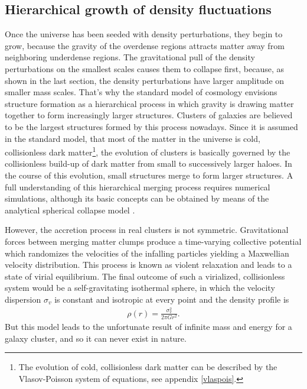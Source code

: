\subsection{Hierarchical growth of density fluctuations}
Once the universe has been seeded with density perturbations, they begin to
grow, because the gravity of the overdense regions attracts matter
away from neighboring underdense regions. The gravitational pull of the density
perturbations on the smallest scales causes them to collapse first,
because, as shown in the last section, the density perturbations have larger
amplitude on smaller mass scales. That's why the standard model of cosmology
envisions structure formation as a hierarchical process in which gravity is
drawing matter together to form increasingly larger structures.
Clusters of galaxies are believed to be the largest structures formed by this
process nowadays. Since it is assumed in the standard model, that most
of the matter in the universe is cold, collisionless dark matter\footnote{The
evolution of cold, collisionless dark matter can be described by the
Vlasov-Poisson system of equations, see appendix \ref{vlaspois}.}, the evolution
of clusters is basically governed by the collisionless build-up of dark
matter from small to successively larger haloes. In the
course of this
evolution, small structures merge to form larger structures. A full
understanding of this hierarchical merging process requires
numerical simulations, although its basic concepts can be obtained by means of
the analytical spherical collapse model \citep{Gunn1972,Bertschinger1985}.

However, the accretion process in real clusters is not symmetric. Gravitational
forces between merging matter clumps produce a time-varying collective
potential which randomizes the velocities of the infalling particles yielding
a Maxwellian velocity distribution. This process is known as violent relaxation
\citep{Lynden-Bell1967} and leads to a state of virial equilibrium.
The final outcome of such a virialized, collisionless system would be a
self-gravitating isothermal sphere, in which the velocity dispersion $\sigma_v$
is constant and isotropic at every point and the density profile is
\begin{align}
\rho(r)= \frac{\sigma_v^2}{2 \pi G r^2}.
\end{align}
But this model leads to the unfortunate result of infinite mass and energy
for a galaxy cluster, and so it can never exist in nature.


